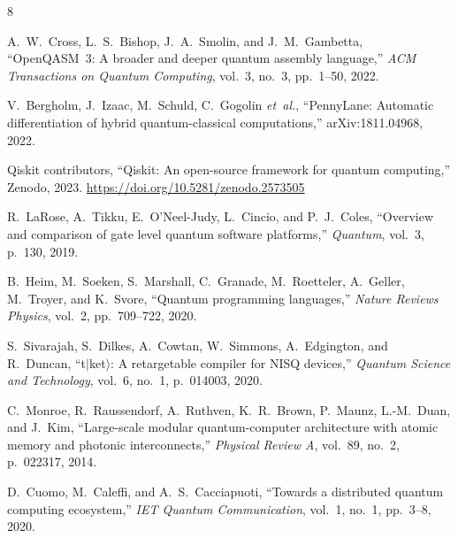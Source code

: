 \documentclass[conference]{IEEEtran}
\begin{document}
\begin{thebibliography}{8}

A.~W.~Cross, L.~S.~Bishop, J.~A.~Smolin, and J.~M.~Gambetta, ``OpenQASM~3: A broader and deeper quantum assembly language,'' \emph{ACM Transactions on Quantum Computing}, vol.~3, no.~3, pp.~1--50, 2022.

V.~Bergholm, J.~Izaac, M.~Schuld, C.~Gogolin \emph{et~al.}, ``PennyLane: Automatic differentiation of hybrid quantum-classical computations,'' arXiv:1811.04968, 2022.

Qiskit contributors, ``Qiskit: An open-source framework for quantum computing,'' Zenodo, 2023. \url{https://doi.org/10.5281/zenodo.2573505}

R.~LaRose, A.~Tikku, E.~O'Neel-Judy, L.~Cincio, and P.~J.~Coles, ``Overview and comparison of gate level quantum software platforms,'' \emph{Quantum}, vol.~3, p.~130, 2019.

B.~Heim, M.~Soeken, S.~Marshall, C.~Granade, M.~Roetteler, A.~Geller, M.~Troyer, and K.~Svore, ``Quantum programming languages,'' \emph{Nature Reviews Physics}, vol.~2, pp.~709--722, 2020.

S.~Sivarajah, S.~Dilkes, A.~Cowtan, W.~Simmons, A.~Edgington, and R.~Duncan, ``t$|$ket$\rangle$: A retargetable compiler for NISQ devices,'' \emph{Quantum Science and Technology}, vol.~6, no.~1, p.~014003, 2020.

C.~Monroe, R.~Raussendorf, A.~Ruthven, K.~R.~Brown, P.~Maunz, L.-M.~Duan, and J.~Kim, ``Large-scale modular quantum-computer architecture with atomic memory and photonic interconnects,'' \emph{Physical Review A}, vol.~89, no.~2, p.~022317, 2014.

D.~Cuomo, M.~Caleffi, and A.~S.~Cacciapuoti, ``Towards a distributed quantum computing ecosystem,'' \emph{IET Quantum Communication}, vol.~1, no.~1, pp.~3--8, 2020.

\end{thebibliography}
\end{document}
